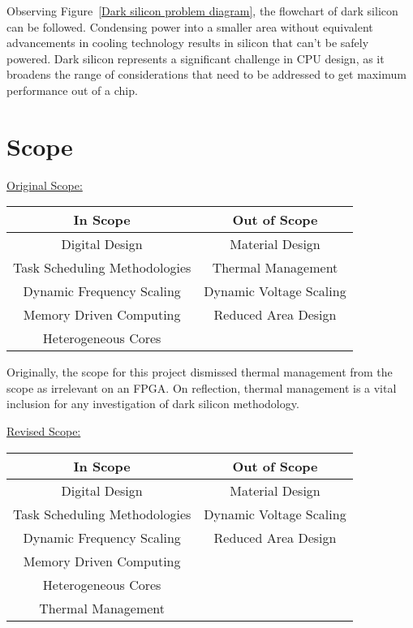 	Observing Figure~\ref{Dark silicon problem diagram}, the flowchart of dark silicon can be followed. Condensing power into a smaller area without equivalent advancements in cooling technology results in silicon that can't be safely powered. Dark silicon represents a significant challenge in CPU design, as it broadens the range of considerations that need to be addressed to get maximum performance out of a chip.

\section{Scope}
	\underline{Original Scope:}
	\begin{center}
		\begin{tabular}{|c|c|}
			\hline
			In Scope & Out of Scope\\
			\hline
			Digital Design & Material Design\\
			Task Scheduling Methodologies & Thermal Management\\
			Dynamic Frequency Scaling & Dynamic Voltage Scaling\\
			Memory Driven Computing & Reduced Area Design\\
			Heterogeneous Cores & \\
			\hline
		\end{tabular}
	\end{center}

	Originally, the scope for this project dismissed thermal management from the scope as irrelevant on an FPGA. On reflection, thermal management is a vital inclusion for any investigation of dark silicon methodology.
	
	\vspace{5mm}
	\noindent
	\underline{Revised Scope:}
	\begin{center}
		\begin{tabular}{|c|c|}
			\hline
			In Scope & Out of Scope\\
			\hline
			Digital Design & Material Design\\
			Task Scheduling Methodologies & Dynamic Voltage Scaling\\
			Dynamic Frequency Scaling & Reduced Area Design\\
			Memory Driven Computing & \\
			Heterogeneous Cores & \\
			Thermal Management & \\
			\hline
		\end{tabular}
	\end{center}


